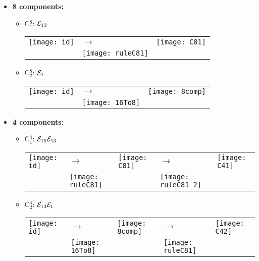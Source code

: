\begin{itemize}
\item \textbf{8 components:} 
\begin{itemize}
\item C$_1^8$: $\mathcal{E}_{13}$\newline
\begin{tabular}{m{2cm} m{2cm} m{2cm}}
\texttt{[image: id]}  
& \hspace{0.8cm}$\longrightarrow$ 
& \texttt{[image: C81]} \\ 
 & \texttt{[image: ruleC81]} & 
\end{tabular} 

\item C$_2^8$: $\mathcal{E}_1$\newline
\begin{tabular}{m{2cm} m{2cm} m{2cm}}
\texttt{[image: id]}  
& \hspace{0.8cm}$\longrightarrow$ 
& \texttt{[image: 8comp]}\\ 
 & \texttt{[image: 16To8]} &  
\end{tabular} 
\end{itemize}

\item \textbf{4 components:} \newline
\begin{itemize}
\item C$_1^4$: $\mathcal{E}_{15}\mathcal{E}_{13}$\newline
\begin{tabular}{m{2cm} m{2cm} m{2cm} m{2cm} m{2cm}}
\texttt{[image: id]}  
& \hspace{0.8cm}$\longrightarrow$ 
& \texttt{[image: C81]} 
& \hspace{0.8cm}$\longrightarrow$ 
& \texttt{[image: C41]}\\ 
 & \texttt{[image: ruleC81]} &  
 & \texttt{[image: ruleC81\_2]} &\\ 
\end{tabular} 

\item C$_2^4$: $\mathcal{E}_{13}\mathcal{E}_1$\newline
\begin{tabular}{m{2cm} m{2cm} m{2cm} m{2cm} m{2cm}}
\texttt{[image: id]}  
& \hspace{0.8cm}$\longrightarrow$ 
& \texttt{[image: 8comp]} 
& \hspace{0.8cm}$\longrightarrow$ 
& \texttt{[image: C42]}\\ 
 & \texttt{[image: 16To8]} &  
 & \texttt{[image: ruleC81]} &\\ 
\end{tabular} 


\end{itemize}
\end{itemize}
